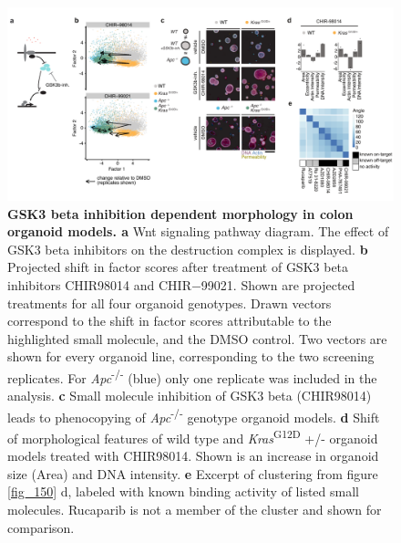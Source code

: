 \begin{flushleft}
\begin{figure}[h]
\centering
\includegraphics[scale=0.75,
                keepaspectratio]{figures/adenomaprofiling/pdf/fig_2_4_2.pdf}
\caption[GSK3 beta inhibition dependent morphology in colon organoid models]{\textbf{GSK3 beta inhibition dependent morphology in colon organoid models. a} Wnt signaling pathway diagram. The effect of GSK3 beta inhibitors on the destruction complex is displayed. \textbf{b} Projected shift in factor scores after treatment of GSK3 beta inhibitors CHIR98014 and CHIR−99021. Shown are projected treatments for all four organoid genotypes. Drawn vectors correspond to the shift in factor scores attributable to the highlighted small molecule, and the DMSO control. Two vectors are shown for every organoid line, corresponding to the two screening replicates. For \textit{Apc}\textsuperscript{-/-} (blue) only one replicate was included in the analysis. \textbf{c} Small molecule inhibition of GSK3 beta (CHIR98014) leads to phenocopying of \textit{Apc}\textsuperscript{-/-}  genotype organoid models. \textbf{d} Shift of morphological features of wild type and \textit{Kras}\textsuperscript{G12D} +/- organoid models treated with CHIR98014. Shown is an increase in organoid size (Area) and DNA intensity. \textbf{e} Excerpt of clustering from figure \ref{fig_150} d, labeled with known binding activity of listed small molecules. Rucaparib is not a member of the cluster and shown for comparison.}
\label{fig_185}
\end{figure}
\bigbreak


\end{flushleft}
